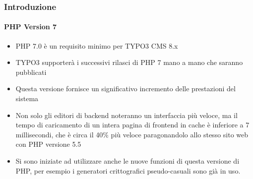 \begin{frame}[fragile]
	\frametitle{Introduzione}
	\framesubtitle{PHP Version 7}

	\begin{itemize}

		\item PHP 7.0 è un requisito minimo per TYPO3 CMS 8.x
		\item TYPO3 supporterà i successivi rilasci di PHP 7 mano a mano che saranno pubblicati
		\item Questa versione fornisce un significativo incremento delle prestazioni del sistema

		\item Non solo gli editori di backend noteranno un interfaccia più veloce, ma il tempo
			di caricamento di un intera pagina di frontend in cache è inferiore a
			7 millisecondi, che è circa il 40\% più veloce paragonandolo
			allo stesso sito web con PHP versione 5.5

		\item Si sono iniziate ad utilizzare anche le nuove funzioni di questa versione di PHP,
			per esempio i generatori crittografici pseudo-casuali sono già in uso.

	\end{itemize}

\end{frame}

